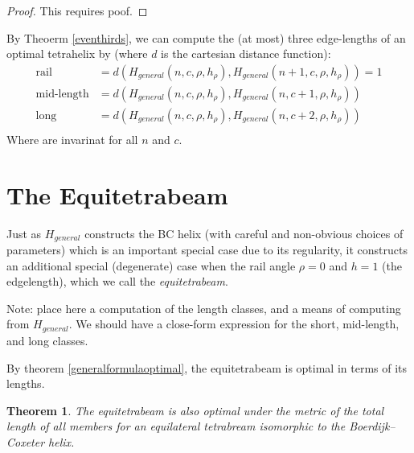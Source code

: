 \documentclass[11pt]{article}
\newtheorem{theorem}{Theorem}
\begin{document}
\begin{proof}
  This requires poof.
\end{proof}

By Theoerm \ref{eventhirds}, we can compute the (at most) three edge-lengths of an optimal
tetrahelix by (where $d$ is the cartesian distance function):
\begin{align*}
  \text{rail} &= d(H_{general}(n,c,\rho,h_{\rho}),H_{general}(n+1,c,\rho,h_{\rho})) = 1 \\
  \text{mid-length} &= d(H_{general}(n,c,\rho,h_{\rho}),H_{general}(n,c+1,\rho,h_{\rho}))  \\
  \text{long} &= d(H_{general}(n,c,\rho,h_{\rho}),H_{general}(n,c+2,\rho,h_{\rho}))  \\  
\end{align*}
Where are invarinat for all $n$ and $c$.


\section{The Equitetrabeam}

Just as $H_{general}$ constructs the BC helix (with careful and non-obvious choices of parameters) which is an important
special case due to its regularity, it constructs an additional special (degenerate) case when the rail angle $\rho = 0$
and $h = 1$ (the edgelength), which we call the \emph{equitetrabeam}.

Note: place here a computation of the length classes, and a means of computing from $H_{general}$.
We should have a close-form expression for the short, mid-length, and long classes.

By theorem \ref{generalformulaoptimal}, the equitetrabeam is optimal in terms of its lengths.


\begin{theorem}
  The equitetrabeam is also optimal under the metric of the total length of all members 
  for an equilateral tetrabream isomorphic to the Boerdijk--Coxeter helix.
\end{theorem}
\end{document}
